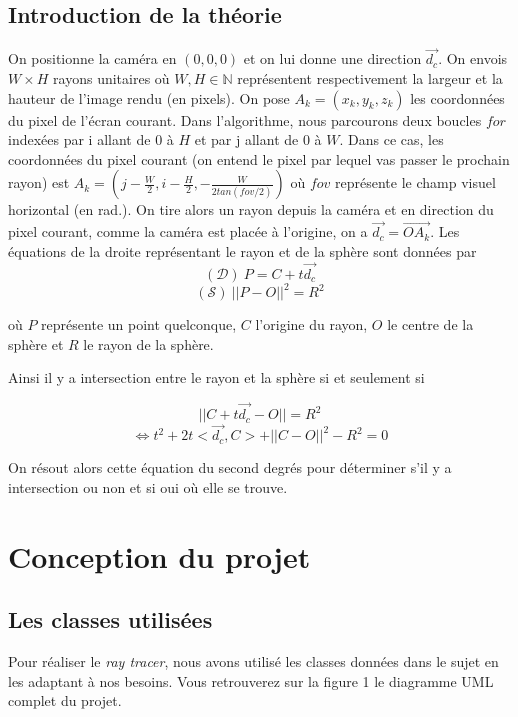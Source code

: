 \documentclass[11pt, oneside]{article}   	%
\begin{document}
\subsection{Introduction de la théorie}
On positionne la caméra en $(0,0,0)$ et on lui donne une direction $\vec{d_{c}}$. On envois $W\times H$ rayons unitaires où $W,H \in \mathbb{N}$ représentent respectivement la largeur et la hauteur de l'image rendu (en pixels). On pose $A_{k}=(x_{k},y_{k},z_{k})$ les coordonnées du pixel de l'écran courant. Dans l'algorithme, nous parcourons deux boucles $\mathit{for}$ indexées par i allant de $0$ à $H$ et par j allant de $0$ à $W$. Dans ce cas, les coordonnées du pixel courant (on entend le pixel par lequel vas passer le prochain rayon) est $A_{k} = (j-\frac{W}{2},i-\frac{H}{2},- \frac{W}{2tan(fov/2)})$ où $fov$ représente le champ visuel horizontal (en rad.). On tire alors un rayon depuis la caméra et en direction du pixel courant, comme la caméra est placée à l'origine, on a $\vec{d_c} = \vec{{OA_k}}$.
Les équations de la droite représentant le rayon et de la sphère sont données par
$$(\mathcal{D})\ P = C+t\vec{d_c}$$
$$(\mathcal{S})\ ||P-O||^2 = R^2$$

où $P$ représente un point quelconque, $C$ l'origine du rayon, $O$ le centre de la sphère et $R$ le rayon de la sphère.

Ainsi il y a intersection entre le rayon et la sphère si et seulement si

$$ ||C+t\vec{d_c} - O || = R^2$$
$$\iff t^2 +2t<\vec{d_c},C>+||C-O||^2 - R^2 = 0$$

On résout alors cette équation du second degrés pour déterminer s'il y a intersection ou non et si oui où elle se trouve.

\section{Conception du projet}
\subsection{Les classes utilisées}
Pour réaliser le \textit{ray tracer}, nous avons utilisé les classes données dans le sujet en les adaptant à nos besoins. Vous retrouverez sur la figure 1 le diagramme UML complet du projet.
\end{document}
